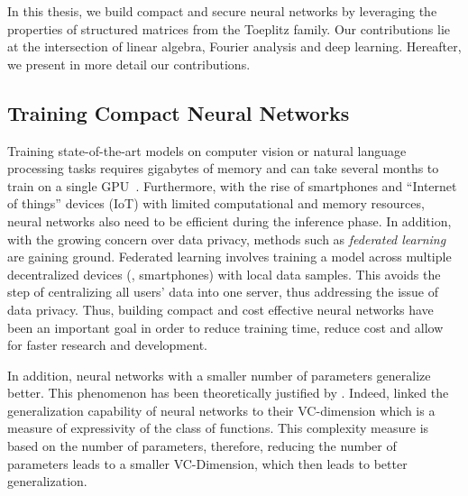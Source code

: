 In this thesis, we build compact and secure neural networks by leveraging the properties of structured matrices from the Toeplitz family.
Our contributions lie at the intersection of linear algebra, Fourier analysis and deep learning.
Hereafter, we present in more detail our contributions.

\subsection{Training Compact Neural Networks}
\label{subsection:ch1-training_compact_neural_networks}

Training state-of-the-art models on computer vision or natural language processing tasks requires gigabytes of memory and can take several months to train on a single GPU~\cite{krizhevsky2012imagenet,brown2020language}.
Furthermore, with the rise of smartphones and ``Internet of things'' devices (IoT) with limited computational and memory resources, neural networks also need to be efficient during the inference phase.
In addition, with the growing concern over data privacy, methods such as \emph{federated learning} are gaining ground.
Federated learning involves training a model across multiple decentralized devices (\eg, smartphones) with local data samples.
This avoids the step of centralizing all users' data into one server, thus addressing the issue of data privacy.
Thus, building compact and cost effective neural networks have been an important goal in order to reduce training time, reduce cost and allow for faster research and development.



In addition, neural networks with a smaller number of parameters generalize better.
This phenomenon has been theoretically justified by \citet{vapnik1982estimation}.
Indeed, \citeauthor{vapnik1982estimation} linked the generalization capability of neural networks to their VC-dimension which is a measure of expressivity of the class of functions.
This complexity measure is based on the number of parameters, therefore, reducing the number of parameters leads to a smaller VC-Dimension, which then leads to better generalization.

